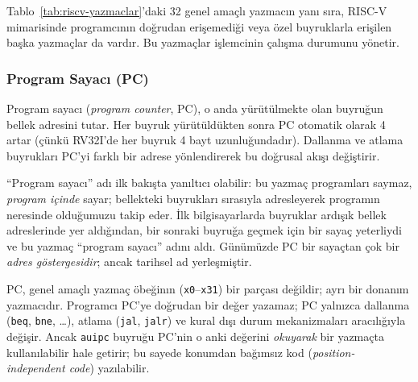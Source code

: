 Tablo~\ref{tab:riscv-yazmaclar}'daki 32 genel amaçlı yazmacın yanı sıra, RISC-V mimarisinde programcının doğrudan erişemediği veya özel buyruklarla erişilen başka yazmaçlar da vardır. Bu yazmaçlar işlemcinin çalışma durumunu yönetir.

\subsubsection{Program Sayacı (PC)}

Program sayacı (\emph{program counter}, PC), o anda yürütülmekte olan buyruğun bellek adresini tutar. Her buyruk yürütüldükten sonra PC otomatik olarak 4 artar (çünkü RV32I'de her buyruk 4 bayt uzunluğundadır). Dallanma ve atlama buyrukları PC'yi farklı bir adrese yönlendirerek bu doğrusal akışı değiştirir.

``Program sayacı'' adı ilk bakışta yanıltıcı olabilir: bu yazmaç programları saymaz, \emph{program içinde} sayar; bellekteki buyrukları sırasıyla adresleyerek programın neresinde olduğumuzu takip eder. İlk bilgisayarlarda buyruklar ardışık bellek adreslerinde yer aldığından, bir sonraki buyruğa geçmek için bir sayaç yeterliydi ve bu yazmaç ``program sayacı'' adını aldı. Günümüzde PC bir sayaçtan çok bir \emph{adres göstergesidir}; ancak tarihsel ad yerleşmiştir.

PC, genel amaçlı yazmaç öbeğinın (\texttt{x0}--\texttt{x31}) bir parçası değildir; ayrı bir donanım yazmacıdır. Programcı PC'ye doğrudan bir değer yazamaz; PC yalnızca dallanma (\texttt{beq}, \texttt{bne}, \ldots), atlama (\texttt{jal}, \texttt{jalr}) ve kural dışı durum mekanizmaları aracılığıyla değişir. Ancak \texttt{auipc} buyruğu PC'nin o anki değerini \emph{okuyarak} bir yazmaçta kullanılabilir hale getirir; bu sayede konumdan bağımsız kod (\emph{position-independent code}) yazılabilir.

